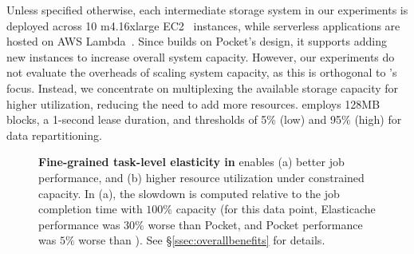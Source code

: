  Unless specified otherwise, each intermediate storage system in our experiments is deployed across 10 m4.16xlarge EC2~\cite{ec2} instances, while serverless applications are hosted on AWS Lambda~\cite{ec2}. Since \jiffy builds on Pocket's design, it supports adding new instances to increase overall system capacity. However, our experiments do not evaluate the overheads of scaling system capacity, as this is orthogonal to \jiffy’s focus. Instead, we concentrate on multiplexing the available storage capacity for higher utilization, reducing the need to add more resources. \jiffy employs 128MB blocks, a 1-second lease duration, and thresholds of 5\% (low) and 95\% (high) for data repartitioning.

\begin{figure}[t]
  \centering
  \caption[Fine-grained task-level elasticity in \jiffy]{\textbf{Fine-grained task-level elasticity in \jiffy} enables (a) better job performance, and (b) higher resource utilization under constrained capacity. In (a), the slowdown is computed relative to the job completion time with $100\%$ capacity (for this data point, Elasticache performance was $30\%$ worse than Pocket, and Pocket performance was $5\%$ worse than \jiffy). See \S\ref{ssec:overallbenefits} for details.}
  \label{fig:elasticity}\vspace{-1.25em}
\end{figure}


